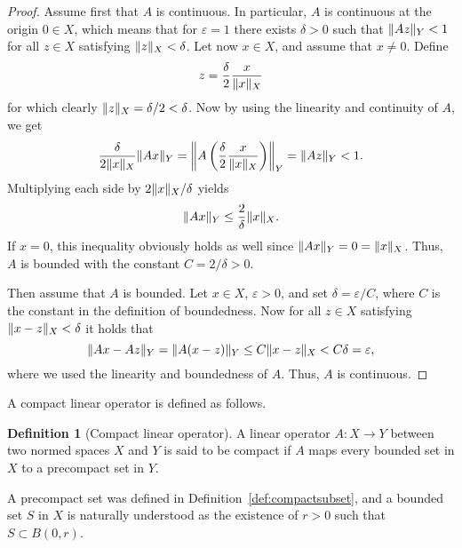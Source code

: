 \documentclass[english, 12pt, a4paper, sci, utf8, a-2b, online]{aaltothesis}
\theoremstyle{definition}
\newtheorem{definition}{Definition}[section]
\theoremstyle{plain}
\DeclarePairedDelimiter\norm{\lVert}{\rVert}
\numberwithin{equation}{section}
\begin{document}
\begin{proof}
    Assume first that $A$ is continuous.
    In particular, $A$ is continuous at the origin $0 \in X$, which
    means that for $\varepsilon=1$ there exists $\delta > 0$ such that
    $\norm{Az}_Y < 1$ for all $z \in X$ satisfying
    $\norm{z}_X < \delta$.
    Let now $x \in  X$, and assume that $x \neq 0$. Define
    \begin{equation*}
        z = \frac{\delta}{2} \frac{x}{\norm{x}_X}
    \end{equation*}
    for which clearly $\norm{z}_X = \delta/2 < \delta$.
    Now by using the linearity and continuity of $A$, we get
    \begin{equation*}
        \frac{\delta}{2 \norm{x}_X} \norm{Ax}_Y
        = \norm*{A\left( \frac{\delta}{2} \frac{x}{\norm{x}_X} \right)}_Y
        = \norm{Az}_Y
        < 1.
    \end{equation*}
    Multiplying each side by $2 \norm{x}_X / \delta$ yields
    \begin{equation*}
        \norm{Ax}_Y \leq \frac{2}{\delta} \norm{x}_X.
    \end{equation*}
    If $x=0$, this inequality
    obviously holds as well since $\norm{Ax}_Y = 0 =\norm{x}_X$. Thus,
    $A$ is bounded with the constant $C = 2/\delta > 0$.

    Then assume that $A$ is bounded.
    Let $x \in X$, $\varepsilon > 0$, and set $\delta = \varepsilon / C$,
    where $C$ is the constant in the definition of boundedness. Now
    for all $z \in X$ satisfying $\norm{x-z}_X < \delta$ it holds that
    \begin{equation*}
        \norm{Ax - Az}_Y
        = \norm{A(x-z)}_Y
        \leq C \norm{x-z}_X
        < C \delta
        = \varepsilon,
    \end{equation*}
    where we used the linearity and boundedness of $A$. Thus, $A$ is continuous.
\end{proof}

A compact linear operator is defined as follows.
\begin{definition}[Compact linear operator]
    \label{def:compactoperator}
    A linear operator $A: X \to Y$ between two normed spaces $X$ and $Y$
    is said to be compact if $A$ maps every bounded set in $X$ to
    a precompact set in $Y$.
\end{definition}
A precompact set was defined in Definition~\ref{def:compactsubset},
and a bounded set $S$ in $X$ is naturally understood as the existence of $r > 0$
such that $S \subset B(0,r)$.
\end{document}
